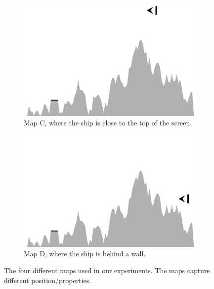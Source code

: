 \documentclass[conference]{IEEEtran}
\begin{document}
\begin{figure}[ht]
\begin{subfigure}{0.49\textwidth}
        \end{subfigure}
\\
        \begin{subfigure}{0.49\textwidth}
                \centering
                \includegraphics[width=1.0\textwidth]{./graphics/map1-tall.pdf}
                \caption{Map C, where the ship is close to the top of the screen.}
                \label{fig:map1-tall}\end{subfigure}\begin{subfigure}{0.49\textwidth}
                \centering
                \includegraphics[width=1.0\textwidth]{./graphics/map1-wall.pdf}
                \caption{Map D, where the ship is behind a wall.}
                \label{fig:map-wall}

        \end{subfigure}
       

         \caption{The four different maps used in our experiments. The maps capture different position/properties.}
         \label{fig:maps}

\end{figure}
\end{document}
